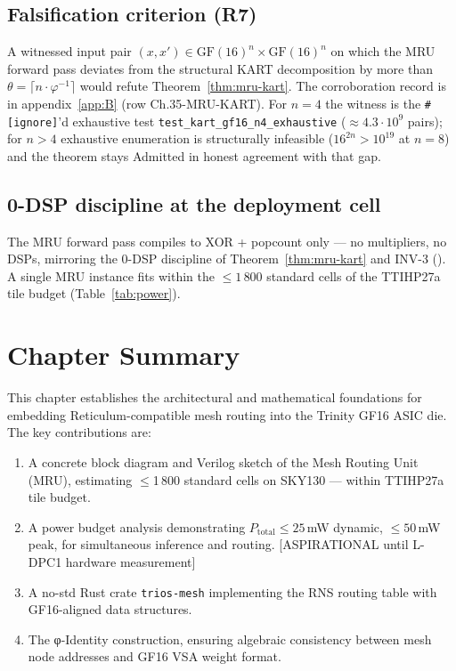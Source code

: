 \subsection*{Falsification criterion (R7)}
\label{sec:mru-kart-falsify}
A witnessed input pair $(x, x') \in \mathrm{GF}(16)^n \times
\mathrm{GF}(16)^n$ on which the MRU forward pass deviates from the
structural KART decomposition by more than $\theta = \lceil n \cdot
\varphi^{-1} \rceil$ would refute Theorem~\ref{thm:mru-kart}. The
corroboration record is in
appendix~\ref{app:B} (row Ch.35-MRU-KART). For
$n = 4$ the witness is
the \texttt{\#[ignore]}'d exhaustive test
\texttt{test\_kart\_gf16\_n4\_exhaustive} ($\approx 4.3\cdot 10^9$
pairs); for $n > 4$ exhaustive enumeration is structurally infeasible
($16^{2n} > 10^{19}$ at $n = 8$) and the theorem stays Admitted in
honest agreement with that gap.

\subsection*{0-DSP discipline at the deployment cell}
The MRU forward pass compiles to XOR + popcount only — no
multipliers, no DSPs, mirroring the 0-DSP discipline of
Theorem~\ref{thm:mru-kart} and INV-3
(). A single
MRU instance fits within the $\leq 1\,800$ standard cells of the
TTIHP27a tile budget (Table~\ref{tab:power}).



\section{Chapter Summary}

This chapter establishes the architectural and mathematical foundations
for embedding Reticulum-compatible mesh routing into the Trinity GF16
ASIC die.
The key contributions are:
\begin{enumerate}
  \item A concrete block diagram and Verilog sketch of the
        Mesh Routing Unit (MRU), estimating $\leq$1\,800 standard cells
        on SKY130 — within TTIHP27a tile budget.
  \item A power budget analysis demonstrating
        $P_{\text{total}} \leq 25$\,mW dynamic, $\leq 50$\,mW peak,
        for simultaneous inference and routing. [ASPIRATIONAL until
        L-DPC1 hardware measurement]
  \item A no-std Rust crate \texttt{trios-mesh} implementing
        the RNS routing table with GF16-aligned data structures.
  \item The φ-Identity construction, ensuring algebraic consistency
        between mesh node addresses and GF16 VSA weight format.
\end{enumerate}

